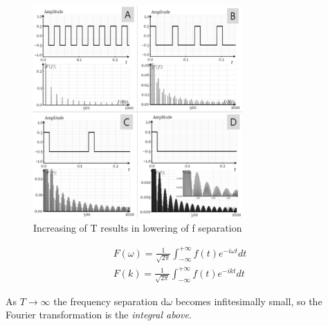 \documentclass[11pt]{article}
\begin{document}
    \begin{figure}[h]
        \centering
        \includegraphics[width=8cm]{1.jpg}
        \caption{Increasing of T results in lowering of f separation}
    \end{figure}
    
    \begin{align*}
        F(\omega) = \frac{1}{\sqrt{2\pi}} \int_{-\infty}^{+\infty} f(t) e^{-i\omega t} dt\\
        F(k) = \frac{1}{\sqrt{2\pi}} \int_{-\infty}^{+\infty} f(t) e^{-ikt} dt
    \end{align*}

    As \(T \to \infty\) the frequency separation d\(\omega\) becomes infitesimally small, so the Fourier
    transformation is the \emph{integral above}.
\end{document}
